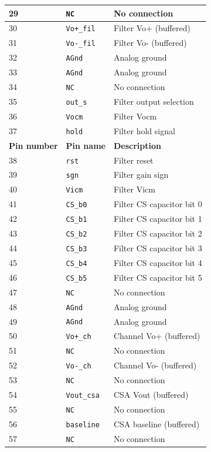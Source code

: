 \documentclass[11pt,letterpaper,spanish]{article}
\begin{document}
\begin{center}
\begin{longtable}{|l|l|l|}
29 & \verb=NC= & No connection \\\hline
30 & \verb=Vo+_fil= & Filter Vo+ (buffered) \\\hline
31 & \verb=Vo-_fil= & Filter Vo- (buffered) \\\hline
32 & \verb=AGnd= & Analog ground \\\hline
33 & \verb=AGnd= & Analog ground \\\hline
34 & \verb=NC= & No connection \\\hline
35 & \verb=out_s= & Filter output selection \\\hline
36 & \verb=Vocm= & Filter Vocm \\\hline
37 & \verb=hold= & Filter hold signal  \\\hline
{\bf Pin number} & {\bf Pin name} & {\bf Description} \\ \hline\hline
38 & \verb=rst= & Filter reset \\\hline
39 & \verb=sgn= & Filter gain sign \\\hline
40 & \verb=Vicm= & Filter Vicm \\\hline
41 & \verb=CS_b0= & Filter CS capacitor bit 0 \\\hline
42 & \verb=CS_b1= & Filter CS capacitor bit 1 \\\hline
43 & \verb=CS_b2= & Filter CS capacitor bit 2 \\\hline
44 & \verb=CS_b3= & Filter CS capacitor bit 3 \\\hline
45 & \verb=CS_b4= & Filter CS capacitor bit 4 \\\hline
46 & \verb=CS_b5= & Filter CS capacitor bit 5 \\\hline
47 & \verb=NC= & No connection \\\hline
48 & \verb=AGnd= & Analog ground \\\hline
49 & \verb=AGnd= & Analog ground \\\hline
50 & \verb=Vo+_ch= & Channel Vo+ (buffered) \\\hline
51 & \verb=NC= & No connection \\\hline
52 & \verb=Vo-_ch= & Channel Vo- (buffered)\\\hline
53 & \verb=NC= & No connection \\\hline
54 & \verb=Vout_csa= & CSA Vout (buffered) \\\hline
55 & \verb=NC= & No connection \\\hline
56 & \verb=baseline= & CSA baseline (buffered) \\\hline
57 & \verb=NC= & No connection \\\hline

\end{longtable}
\end{center}
\end{document}
